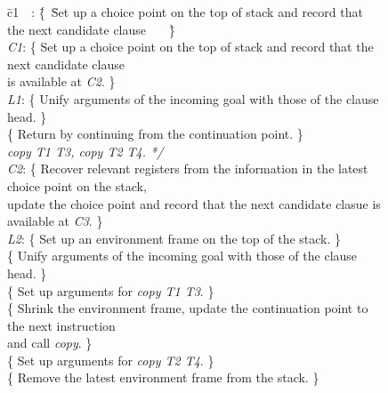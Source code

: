 \begin{figure}\footnotesize
\begin{tabbing}
\quad\= c1\ \ : \=\{\ \=Set up a choice point on the top of stack and record that the next candidate clause \ \ \ \=\}\kill
{}                                                                                     \\
\> {\it C1}:  \>\{  \>Set up a choice point on the top of stack and record that the next candidate clause       \\
\>            \>    \>is available at {\it C2}.                                                            \>\} \\
\> {\it L1}:  \>\{  \>Unify arguments of the incoming goal with those of the clause head.                  \>\} \\
\>            \>\{  \>Return by continuing from the continuation point.                                    \>\} \\
  {\it copy T1 T3, copy T2 T4. */}                             \\
\> {\it C2}:  \>\{ \>Recover relevant registers from the information in the latest choice point on the stack,      \\
\>            \>   \>update the choice point and record that the next candidate clasue is available at {\it C3}. \>\} \\
\> {\it L2}:  \>\{ \>Set up an environment frame on the top of the stack.                                        \>\} \\
\>            \>\{ \>Unify arguments of the incoming goal with those of the clause head.                         \>\} \\
\>            \>\{ \>Set up arguments for {\it copy T1 T3}.                                                      \>\} \\
\>            \>\{ \>Shrink the environment frame, update the continuation point to the next instruction              \\
\>            \>   \>and call {\it copy}.                                                                        \>\} \\
\>            \>\{ \>Set up arguments for {\it copy T2 T4}.                                                      \>\} \\
\>            \>\{ \>Remove the latest environment frame from the stack.                                            \>\} \\

\end{tabbing}
\end{figure}
